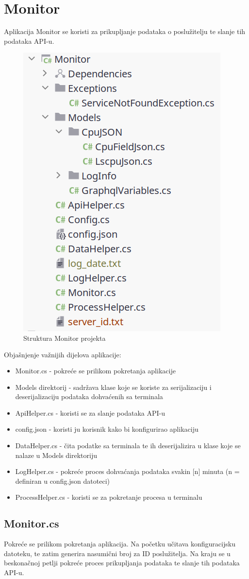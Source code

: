 \documentclass[zavrsnirad]{fer}
\begin{document}
\chapter{Monitor}
Aplikacija Monitor se koristi za prikupljanje podataka o poslužitelju te slanje tih podataka API-u.

\begin{figure}[htb!]
	\centering
	\includegraphics[width=0.4\linewidth]{images/monitor_structure.png} 
	\caption{Struktura Monitor projekta}
	\label{slk:monitor_structure.png}
\end{figure}

Objašnjenje važnijih dijelova aplikacije:
\begin{itemize}
	\item Monitor.cs - pokreće se prilikom pokretanja aplikacije
	\item Models direktorij - sadržava klase koje se koriste za serijalizaciju i deserijalizaciju podataka dohvaćenih sa terminala
	\item ApiHelper.cs - koristi se za slanje podataka API-u
	\item config.json - koristi ju korisnik kako bi konfigurirao aplikaciju
	\item DataHelper.cs - čita podatke sa terminala te ih deserijalizira u klase koje se nalaze u Models direktoriju
	\item LogHelper.cs - pokreće proces dohvaćanja podataka svakin [n] minuta (n = definiran u config.json datoteci)
	\item ProcessHelper.cs - koristi se za pokretanje procesa u terminalu
\end{itemize}

\section{Monitor.cs}
Pokreće se prilikom pokretanja aplikacija. Na početku učitava konfiguracijsku datoteku, te zatim generira nasumični broj za ID poslužitelja. Na kraju se u beskonačnoj petlji pokreće proces prikupljanja podataka te slanje tih podataka API-u.

\end{document}
